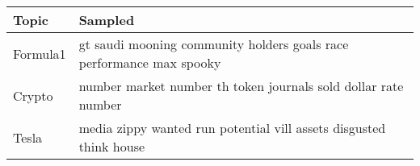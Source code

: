 \begin{tabular}{ll}
\toprule                                                           
Topic    &                                                             Sampled \\
\midrule
Formula1 &  gt saudi mooning community holders goals race performance max spooky \\
Crypto   &        number market number th token journals sold dollar rate number \\
Tesla    &    media zippy wanted run potential vill assets disgusted think house \\
\bottomrule
\end{tabular}
